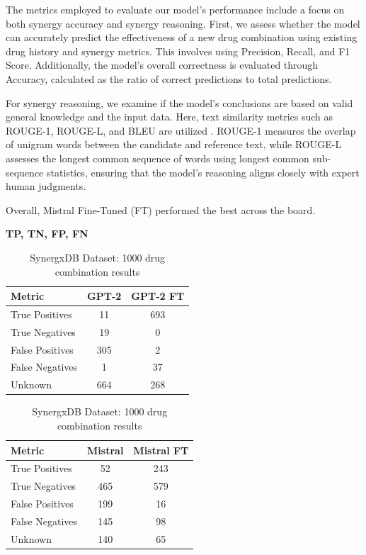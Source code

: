 \documentclass[11pt]{article}
\begin{document}
The metrics employed to evaluate our model's performance include a focus on both synergy accuracy and synergy reasoning. First, we assess whether the model can accurately predict the effectiveness of a new drug combination using existing drug history and synergy metrics. This involves using Precision, Recall, and F1 Score. Additionally, the model's overall correctness is evaluated through Accuracy, calculated as the ratio of correct predictions to total predictions.

For synergy reasoning, we examine if the model's conclusions are based on valid general knowledge and the input data. Here, text similarity metrics such as ROUGE-1, ROUGE-L, and BLEU are utilized \cite{Lin2004ROUGEAP, Papineni2001-we}. ROUGE-1 measures the overlap of unigram words between the candidate and reference text, while ROUGE-L assesses the longest common sequence of words using longest common sub-sequence statistics, ensuring that the model's reasoning aligns closely with expert human judgments.

Overall, Mistral Fine-Tuned (FT) performed the best across the board.

\begin{table}[ht]
\centering
\caption{SynergxDB Dataset: 1000 drug combination results}
\label{table:result}
\textbf{TP, TN, FP, FN}
\par\medskip %
\begin{tabular}{|l|c|c|}
\hline
\textbf{Metric} & \textbf{GPT-2} & \textbf{GPT-2 FT} \\
\hline
True Positives & 11 & 693 \\
True Negatives & 19 & 0 \\
False Positives & 305 & 2 \\
False Negatives & 1 & 37 \\
Unknown & 664 & 268 \\
\hline
\end{tabular}
\par\medskip %
\begin{tabular}{|l|c|c|}
\hline
\textbf{Metric} & \textbf{Mistral} & \textbf{Mistral FT} \\
\hline
True Positives & 52 & 243 \\
True Negatives & 465 & 579 \\
False Positives & 199 & 16 \\
False Negatives & 145 & 98 \\
Unknown & 140 & 65 \\
\hline
\end{tabular}
\end{table}
\end{document}
